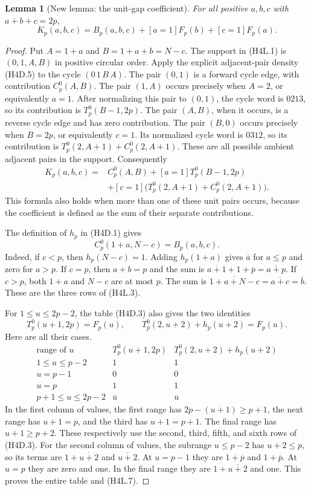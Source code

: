 \documentclass[11pt,oneside]{report}
\newtheorem{lemma}[theorem]{Lemma}
\theoremstyle{definition}
\numberwithin{equation}{section}
\begin{document}
\begin{lemma}[New lemma: the unit-gap coefficient]
\label{J21:lem:h4-unit-coefficient}
For all positive $a,b,c$ with $a+b+c=2p$,
\[
 K_p(a,b,c)=B_p(a,b,c)+[a=1]F_p(b)+[c=1]F_p(a).
 \tag{H4L.4}
\]
\end{lemma}
\begin{proof}
Put $A=1+a$ and $B=1+a+b=N-c$.
The support in (H4L.1) is $(0,1,A,B)$ in positive circular order.
Apply the explicit adjacent-pair density (H4D.5) to the cycle
$(0\,1\,B\,A)$.
The pair $(0,1)$ is a forward cycle edge, with contribution
$C_p^0(A,B)$.
The pair $(1,A)$ occurs precisely when $A=2$, or equivalently $a=1$.
After normalizing this pair to $(0,1)$, the cycle word is $0213$,
so its contribution is $T_p^0(B-1,2p)$.
The pair $(A,B)$, when it occurs, is a reverse cycle edge and has
zero contribution.
The pair $(B,0)$ occurs precisely when $B=2p$, or equivalently $c=1$.
Its normalized cycle word is $0312$, so its contribution is
$T_p^0(2,A+1)+C_p^0(2,A+1)$.
These are all possible ambient adjacent pairs in the support.
Consequently
\begin{align*}
 K_p(a,b,c)={}&C_p^0(A,B)
       +[a=1]T_p^0(B-1,2p)\\
       &+[c=1]\bigl(T_p^0(2,A+1)+C_p^0(2,A+1)\bigr).
 \tag{H4L.5}
\end{align*}
This formula also holds when more than one of these unit pairs occurs,
because the coefficient is defined as the sum of their separate
contributions.

The definition of $h_p$ in (H4D.1) gives
\[
 C_p^0(1+a,N-c)=B_p(a,b,c).
 \tag{H4L.6}
\]
Indeed, if $c<p$, then $h_p(N-c)=1$.
Adding $h_p(1+a)$ gives $\overline a$ for $a\leq p$ and zero for
$a>p$.
If $c=p$, then $a+b=p$ and the sum is
$\overline{a+1}+1+\overline p=\overline{a+p}$.
If $c>p$, both $1+a$ and $N-c$ are at most $p$.
The sum is $\overline{1+a+N-c}=\overline{a+c}=\overline b$.
These are the three rows of (H4L.3).

For $1\leq u\leq2p-2$, the table (H4D.3) also gives the two identities
\[
 T_p^0(u+1,2p)=F_p(u),\qquad
 T_p^0(2,u+2)+h_p(u+2)=F_p(u).
 \tag{H4L.7}
\]
Here are all their cases.
\[
\begin{array}{c|c|c}
 \text{range of }u&T_p^0(u+1,2p)&T_p^0(2,u+2)+h_p(u+2)\\ \hline
 1\leq u\leq p-2&1&1\\
 u=p-1&0&0\\
 u=p&1&1\\
 p+1\leq u\leq2p-2&\overline u&\overline u
\end{array}
 \tag{H4L.8}
\]
In the first column of values, the first range has
$2p-(u+1)\geq p+1$, the next range has $u+1=p$, and the third has
$u+1=p+1$.
The final range has $u+1\geq p+2$.
These respectively use the second, third, fifth, and sixth rows of
(H4D.3).
For the second column of values, the subrange $u\leq p-2$ has
$u+2\leq p$, so its terms are
$1+\overline{u+2}$ and $\overline{u+2}$.
At $u=p-1$ they are $1+\overline p$ and $1+\overline p$.
At $u=p$ they are zero and one.
In the final range they are $1+\overline{u+2}$ and one.
This proves the entire table and (H4L.7).


\end{proof}
\end{document}
